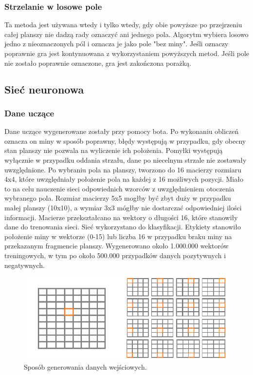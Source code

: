 \documentclass[letterpaper,12pt]{article}
\begin{document}
\subsubsection*{Strzelanie w losowe pole}
Ta metoda jest używana wtedy i tylko wtedy, gdy obie powyższe po przejrzeniu całej planszy
nie dadzą rady oznaczyć ani jednego pola. Algorytm wybiera losowo jedno z nieoznaczonych pól
i oznacza je jako pole "bez miny". Jeśli oznaczy poprawnie gra jest kontynuowana z wykorzystaniem
 powyższych metod. Jeśli pole nie zostało poprawnie oznaczone, gra jest zakończona porażką.

\subsection{Sieć neuronowa}
\subsubsection*{Dane uczące}
Dane uczące wygenerowane zostały przy pomocy bota. Po wykonaniu obliczeń oznacza on miny w sposób poprawny, błędy występują w przypadku, gdy obecny stan planszy
nie pozwala na wyliczenie ich położenia. Pomyłki występują wyłącznie w przypadku oddania strzału, dane po niecelnym strzale nie zostawały uwzględnione. Po wybraniu pola na planszy, 
tworzono do 16 macierzy rozmiaru 4x4, które uwzględniały położenie pola na każdej z 16 możliwych pozycji. Miało to na celu nauczenie sieci odpowiednich wzorców z uwzględnieniem otoczenia wybranego
pola. Rozmiar macierzy 5x5 mogłby być zbyt duży w przypadku małej planszy (10x10), a wymiar 3x3 mógłby nie dostarczać odpowiedniej ilości informacji. Macierze przekształcano na wektory o długości
16, które stanowiły dane do trenowania sieci. Sieć wykorzystano do klasyfikacji. Etykiety stanowiło położenie miny w wektorze (0-15) lub liczba 16 w przypadku braku miny na przekazanym fragmencie planszy.
Wygenerowano około 1.000.000 wektorów treningowych, w tym po około 500.000 przypadków danych pozytywnych i negatywnych.\\
\begin{figure}[H]
    \centering
    \includegraphics[scale=0.75]{generating.png}
    \caption{Sposób generowania danych wejściowych.}
\end{figure}
\end{document}
